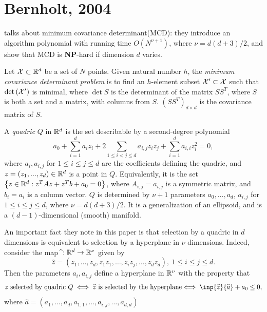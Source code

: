 \documentclass{article}
\begin{document}
\section{Bernholt, 2004}
\cite{bernholt2004complexity} talks about minimum covariance determinant(MCD): they introduce an algorithm polynomial with running time $O(N^{\nu+1})$, where $\nu = d(d+3)/2$, and show that MCD is \textbf{NP}-hard if dimension $d$ varies.

\begin{definition}[MCD]
Let $\mathcal{X}\subset \mathbb{R}^d$ be a set of $N$ points. Given natural number $h$, the \textit{minimum covariance determinant problem} is to find an $h$-element subset $\mathcal{X}'\subset \mathcal{X}$ such that $\text{det}\left(\mathcal{X}'\right)$ is minimal, where $\det{S}$ is the determinant of the matrix $SS^T$, where $S$ is both a set and a matrix, with columns from $S$. $(SS^T)_{d\times d}$ is the covariance matrix of $S$.
\end{definition}

\begin{definition}[Quadric]
A \textit{quadric} $Q$ in $\mathbb{R}^d$ is the set describable by a second-degree polynomial
\begin{equation}
    a_0 + \sum_{i=1}^d a_i z_i + 2\sum_{1\leq i< j\leq d} a_{i,j} z_i z_j + \sum_{i = 1}^d a_{i,i} z_i^2 = 0,
\end{equation}
where $a_i, a_{i,j}$ for $1\leq i\leq j\leq d$ are the coefficients defining the quadric, and $z = (z_1,...,z_d)\in \mathbb{R}^d$ is a point in $Q$.
Equivalently, it is the set $\left\{z\in \mathbb{R}^d : z^T A z + z^T b + a_0 = 0\right\}$, where $A_{i,j} = a_{i,j}$ is a symmetric matrix, and $b_i = a_i$ is a column vector. $Q$ is determined by $\nu+1$ parameters $a_0,...,a_d$,  $a_{i,j}$ for $1\leq i\leq j\leq d$, where $\nu = d(d+3)/2$. It is a generalization of an ellipsoid, and is a $(d-1)$-dimensional (smooth) manifold.
\end{definition}

An important fact they note in this paper is that selection by a quadric in $d$ dimensions is equivalent to selection by a hyperplane in $\nu$ dimensions. Indeed, consider the map $\mathbf{\widehat{}}: \mathbb{R}^d \to \mathbb{R}^\nu$ given by
$$\widehat{z} = (z_1,\dots,z_d, z_1z_1,\dots,z_iz_j,\dots,z_dz_d),\ 1\leq i\leq j\leq d.$$
Then the parameters $a_i,a_{i,j}$ define a hyperplane in $\mathbb{R}^\nu$ with the property that
$$ \text{$z$ selected by quadric $Q \iff \widehat{z} $ is selected by the hyperplane$ \iff \inp{\widehat{z}}{\widehat{a}} + a_0\leq 0$}, $$
where $\widehat{a} = (a_1,\dots,a_d, a_{1,1},\dots,a_{i,j},\dots,a_{d,d})$
\end{document}
